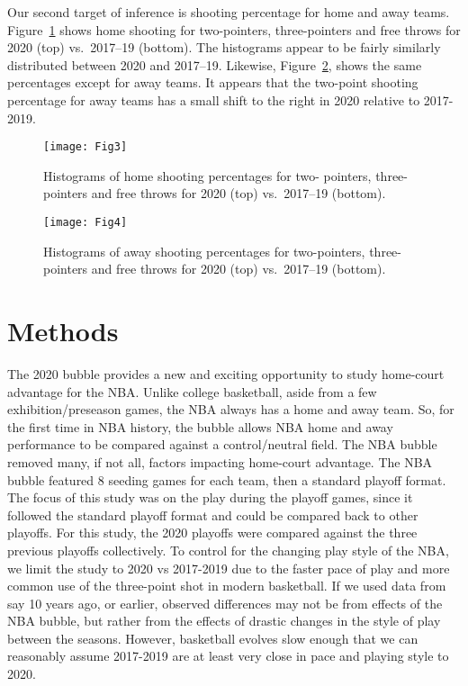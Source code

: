 \documentclass[10pt]{article}
\begin{document}
Our second target of inference is shooting percentage for home and away teams.
Figure~\ref{fig:Fig3} shows home shooting for two-pointers, three-pointers and
free throws for 2020 (top) vs.~2017--19 (bottom). The histograms appear to be fairly
similarly distributed between 2020 and 2017--19. Likewise, Figure~\ref{fig:Fig4},
shows the same percentages except for away teams. It appears that the
two-point shooting percentage for away teams has a small shift to the
right in 2020 relative to 2017-2019.




\begin{figure}[tbp]
  \centering
  \texttt{[image: Fig3]}
  \caption{Histograms of home shooting percentages for two-
    pointers, three-pointers and free throws for 2020 (top) vs.~2017--19
    (bottom).}
  \label{fig:Fig3}
\end{figure}




\begin{figure}[tbp]
  \centering
  \texttt{[image: Fig4]}
  \caption{Histograms of away shooting percentages for two-pointers,
    three-pointers and free throws for 2020 (top) vs.~2017--19
    (bottom).}
  \label{fig:Fig4}  
\end{figure}

\section{Methods}

The 2020 bubble provides a new and exciting opportunity to study home-court
advantage for the NBA. Unlike college basketball, aside from a few
exhibition/preseason games, the NBA always has a home and away team. So, for
the first time in NBA history, the bubble allows NBA home and away performance
to be compared against a control/neutral field. The NBA bubble
removed many, if not all, factors impacting home-court advantage. The NBA 
bubble featured 8 seeding games for each team, then a
standard playoff format. The focus of this study was on the play during the playoff
games, since it followed the standard playoff format and could be compared
back to other playoffs. For this study, the 2020 playoffs were compared against
the three previous playoffs collectively. To control
for the changing play style of the NBA, we limit the study to 2020 vs 2017-2019
due to the faster pace of play and more common use of the three-point shot
in modern basketball. If we used data from say 10 years ago, or earlier, observed
differences may not be from effects of the NBA bubble, but rather from the effects
of drastic changes in the style of play between the seasons. However, basketball
evolves slow enough that we can reasonably assume 2017-2019 are at least very
close in pace and playing style to 2020.
\end{document}
